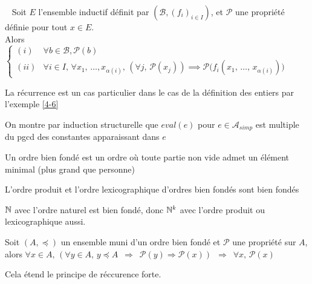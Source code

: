 \begin{theorem}~
	Soit $E$ l'ensemble inductif définit par $(\mathcal B, (f_i)_{i\in I})$, et $\mathcal P$ une propriété définie pour tout $x\in E$.\\
	
	Alors $\left\{ \begin{array}{cl}
		(i) & \forall b \in \mathcal B, \mathcal P(b)\\
		(ii) & \forall i \in I, \, \forall x_1, \, \dots, x_{\alpha(i)}, \, \left( \forall j, \, \mathcal P(x_j)\right) \implies \mathcal P \big( f_i(x_1, \, \dots, \, x_{\alpha(i)})\big)
	\end{array} \right.$	
\end{theorem}

\begin{rem}
	La récurrence est un cas particulier dans le cas de la définition des entiers par l'exemple \ref{4-6}
\end{rem}

\begin{example}
	On montre par induction structurelle que $eval(e)$ pour $e \in \mathcal A_{simp}$ est multiple du pgcd des constantes apparaissant dans $e$
\end{example}

\begin{definition}
	Un ordre bien fondé est un ordre où toute partie non vide admet un élément minimal (plus grand que personne)
\end{definition}

\begin{proposition}
	L'ordre produit et l'ordre lexicographique d'ordres bien fondés sont bien fondés
\end{proposition}

\begin{example}
	$\mathbb{N}$ avec l'ordre naturel est bien fondé, donc $\mathbb{N}^k$ avec l'ordre produit ou lexicographique aussi.
\end{example}

\begin{theorem}
	Soit $(A, \preceq)$ un ensemble muni d'un ordre bien fondé et $\mathcal P$ une propriété sur $A$, alors $\forall x \in A, \, (\forall y \in A, \, y \preceq A \enspace \Rightarrow \enspace \mathcal P(y) \Rightarrow \mathcal P(x)) \enspace \Rightarrow \enspace \forall x ,\, \mathcal P(x)$
\end{theorem}

\begin{rem}
	Cela étend le principe de réccurence forte.
\end{rem}

